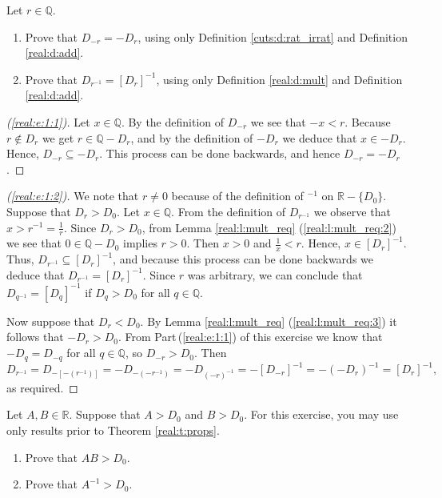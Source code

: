 \Newpage
\begin{exercise} %
	\label{real:e:1}
	Let $r \in \mathbb{Q}$.
	\begin{enumerate}
		\item \label{real:e:1:1}
		      Prove that $D_{-r} = -D_r$, using only Definition \ref{cuts:d:rat_irrat} and Definition \ref{real:d:add}.
		\item \label{real:e:1:2}
		      Prove that $D_{r^{-1}} = [D_r]^{-1}$, using only Definition \ref{real:d:mult} and Definition \ref{real:d:add}.
	\end{enumerate}
\end{exercise}

\begin{proof}[(\ref{real:e:1:1})]
	Let $x \in \mathbb{Q}$. By the definition of $D_{-r}$ we see that $-x < r$. Because $r \notin D_r$ we get $r \in \mathbb{Q} - D_{r}$, and by the definition of $-D_r$ we deduce that $x \in -D_r$. Hence, $D_{-r} \subseteq -D_r$. This process can be done backwards, and hence $D_{-r} = -D_r$.
\end{proof}

\begin{proof}[(\ref{real:e:1:2})]
	We note that $r \neq 0$ because of the definition of ${ }^{-1}$ on $\mathbb{R} - \{ D_0 \}$. Suppose that $D_r > D_0$. Let $x \in \mathbb{Q}$. From the definition of $D_{r^{-1}}$ we observe that $x > r^{-1} = \frac{1}{r}$. Since $D_r > D_0$, from Lemma \ref{real:l:mult_req} (\ref{real:l:mult_req:2}) we see that $0 \in \mathbb{Q} - D_0$ implies $r > 0$. Then $x > 0$ and $\frac{1}{x} < r$. Hence, $x \in [D_r]^{-1}$. Thus, $D_{r^{-1}} \subseteq [D_r]^{-1}$, and because this process can be done backwards we deduce that $D_{r^{-1}} = [D_r]^{-1}$. Since $r$ was arbitrary, we can conclude that $D_{q^{-1}} = [D_q]^{-1}$ if $D_q > D_0$ for all $q \in \mathbb{Q}$.

	Now suppose that $D_r < D_0$. By Lemma \ref{real:l:mult_req} (\ref{real:l:mult_req:3}) it follows that $-D_r > D_0$. From Part\,(\ref{real:e:1:1}) of this exercise we know that $-D_q = D_{-q}$ for all $q \in \mathbb{Q}$, so $D_{-r} > D_0$. Then
	$$
		D_{r^{-1}} = D_{-[-(r^{-1})]} = -D_{-(-r^{-1})} = -D_{(-r)^{-1}} = -[D_{-r}]^{-1} = -(-D_r)^{-1} = [D_r]^{-1},
	$$
	as required.
\end{proof}


\Newpage
\begin{exercise} %
	\label{real:e:2}
	Let $A, B \in \mathbb{R}$. Suppose that $A > D_0$ and $B > D_0$. For this exercise, you may use only results prior to Theorem \ref{real:t:props}.
	\begin{enumerate}
		\item \label{real:e:2:1}
		      Prove that $A B > D_0$.
		\item \label{real:e:2:2}
		      Prove that $A^{-1} > D_0$.
	\end{enumerate}
\end{exercise}

